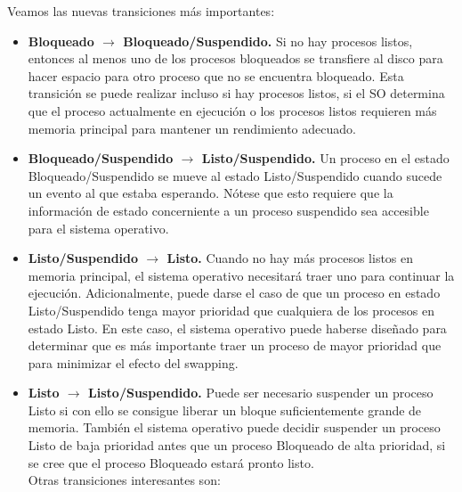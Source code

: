\documentclass{article}
\begin{document}
				Veamos las nuevas transiciones más importantes:
				
				\begin{itemize}
				\item \textbf{Bloqueado $\rightarrow$ Bloqueado/Suspendido.} Si no hay procesos listos, entonces al menos uno de los procesos bloqueados se transfiere al disco para hacer espacio para otro proceso que no se encuentra bloqueado. Esta transición se puede realizar incluso si hay procesos listos, si el SO determina que el proceso actualmente en ejecución o los procesos listos requieren más memoria principal para mantener un rendimiento adecuado.
				\item \textbf{Bloqueado/Suspendido $\rightarrow$ Listo/Suspendido.} Un proceso en el estado Bloqueado/Suspendido se mueve al estado Listo/Suspendido cuando sucede un evento al que estaba esperando. Nótese que esto requiere que la información de estado concerniente a un proceso suspendido sea accesible para el sistema operativo.
				\item \textbf{Listo/Suspendido $\rightarrow$ Listo.} Cuando no hay más procesos listos en memoria principal, el sistema operativo necesitará traer uno para continuar la ejecución. Adicionalmente, puede darse el caso de que un proceso en estado Listo/Suspendido tenga mayor prioridad que cualquiera de los procesos en estado Listo. En este caso, el sistema operativo puede haberse diseñado para determinar que es más importante traer un proceso de mayor prioridad que para minimizar el efecto del swapping.
				\item \textbf{Listo $\rightarrow$ Listo/Suspendido.} Puede ser necesario suspender un proceso Listo si con ello se consigue liberar un bloque suficientemente grande de memoria. También el sistema operativo puede decidir suspender un proceso Listo de baja prioridad antes que un proceso Bloqueado de alta prioridad, si se cree que el proceso Bloqueado estará pronto listo. \\
				
				Otras transiciones interesantes son:
				

\end{itemize}
\end{document}
